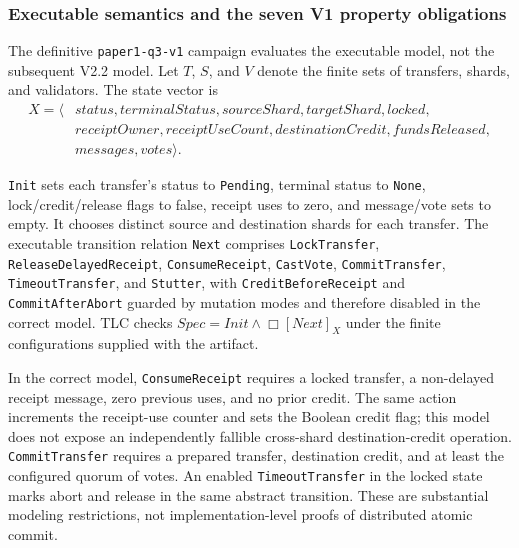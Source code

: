 \subsubsection{Executable semantics and the seven V1 property obligations}
\label{subsubsec:v1-executable-semantics}

The definitive \texttt{paper1-q3-v1} campaign evaluates the executable
 model, not the subsequent V2.2 model. Let $T$,
$S$, and $V$ denote the finite sets of transfers, shards, and validators.
The state vector is
\begin{equation}
\begin{split}
X=\langle &\mathit{status},\mathit{terminalStatus},\mathit{sourceShard},
\mathit{targetShard},\mathit{locked},\\
&\mathit{receiptOwner},\mathit{receiptUseCount},
\mathit{destinationCredit},\mathit{fundsReleased},\\
&\mathit{messages},\mathit{votes}\rangle.
\end{split}
\label{eq:editorial-v1-state}
\end{equation}

\texttt{Init} sets each transfer's status to \texttt{Pending}, terminal
status to \texttt{None}, lock/credit/release flags to false, receipt
uses to zero, and message/vote sets to empty. It chooses distinct source
and destination shards for each transfer. The executable transition
relation \texttt{Next} comprises \texttt{LockTransfer},
\texttt{ReleaseDelayedReceipt}, \texttt{ConsumeReceipt}, \texttt{CastVote},
\texttt{CommitTransfer}, \texttt{TimeoutTransfer}, and \texttt{Stutter},
with \texttt{CreditBeforeReceipt} and \texttt{CommitAfterAbort} guarded
by mutation modes and therefore disabled in the correct model. TLC
checks \(\mathit{Spec}=\mathit{Init}\land\Box[\mathit{Next}]_X\)
under the finite configurations supplied with the artifact.

In the correct model, \texttt{ConsumeReceipt} requires a locked transfer,
a non-delayed receipt message, zero previous uses, and no prior credit.
The same action increments the receipt-use counter and sets the Boolean
credit flag; this model does not expose an independently fallible
cross-shard destination-credit operation. \texttt{CommitTransfer}
requires a prepared transfer, destination credit, and at least the
configured quorum of votes. An enabled \texttt{TimeoutTransfer} in the
locked state marks abort and release in the same abstract transition.
These are substantial modeling restrictions, not implementation-level
proofs of distributed atomic commit.

